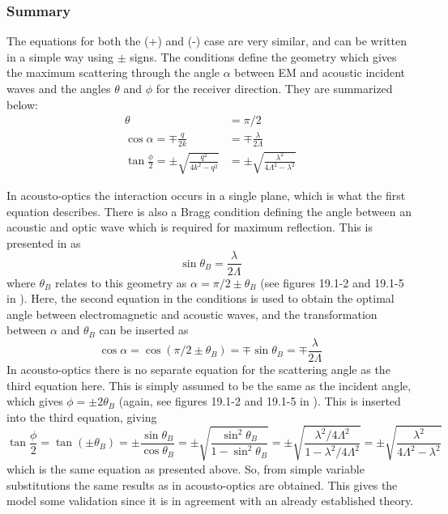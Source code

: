 \documentclass[10pt,a4paper,draft]{scrartcl}
\begin{document}
	\subsubsection{Summary}
	The equations for both the (+) and (-) case are very similar, and can be written in a simple way using $\pm$ signs. The conditions define the geometry which gives the maximum scattering through the angle $\alpha$ between EM and acoustic incident waves and the angles $\theta$ and $\phi$ for the receiver direction. They are summarized below:
	\begin{align*}
			\theta &= \pi/2 \\
			\cos{\alpha} = \mp \frac{q}{2k} &= \mp \frac{\lambda}{2\Lambda} \\
			\tan{\frac{\phi}{2}} = \pm \sqrt{\frac{q^2}{4k^2-q^2}} &= \pm \sqrt{\frac{\lambda^2}{4\Lambda^2-\lambda^2}}
	\end{align*}
	
	In acousto-optics the interaction occurs in a single plane, which is what the first equation describes. There is also a Bragg condition defining the angle between an acoustic and optic wave which is required for maximum reflection. This is presented in \cite{Saleh2007} as
	\begin{equation*}
		\sin{\theta_B} = \frac{\lambda}{2\Lambda}
	\end{equation*}
	where $\theta_B$ relates to this geometry as $\alpha = \pi/2 \pm \theta_B$ (see figures 19.1-2 and 19.1-5 in \cite{Saleh2007}). Here, the second equation in the conditions is used to obtain the optimal angle between electromagnetic and acoustic waves, and the transformation between $\alpha$ and $\theta_B$ can be inserted as
	\begin{equation*}
		\cos{\alpha} = \cos(\pi/2 \pm \theta_B) = \mp \sin{\theta_B} = \mp\frac{\lambda}{2\Lambda}
	\end{equation*}
	In acousto-optics there is no separate equation for the scattering angle as the third equation here. This is simply assumed to be the same as the incident angle, which gives $\phi = \pm 2\theta_B$ (again, see figures 19.1-2 and 19.1-5 in \cite{Saleh2007}). This is inserted into the third equation, giving
	\begin{equation*}
		\tan{\frac{\phi}{2}} = \tan(\pm \theta_B) = \pm \frac{\sin{\theta_B}}{\cos{\theta_B}} = \pm \sqrt{\frac{\sin^2{\theta_B}}{1-\sin^2{\theta_B}}} = \pm \sqrt{\frac{\lambda^2/4\Lambda^2}{1-\lambda^2/4\Lambda^2}} = \pm \sqrt{\frac{\lambda^2}{4\Lambda^2-\lambda^2}}
	\end{equation*}
	which is the same equation as presented above.
	So, from simple variable substitutions the same results as in acousto-optics are obtained. This gives the model some validation since it is in agreement with an already established theory.
	
\end{document}
